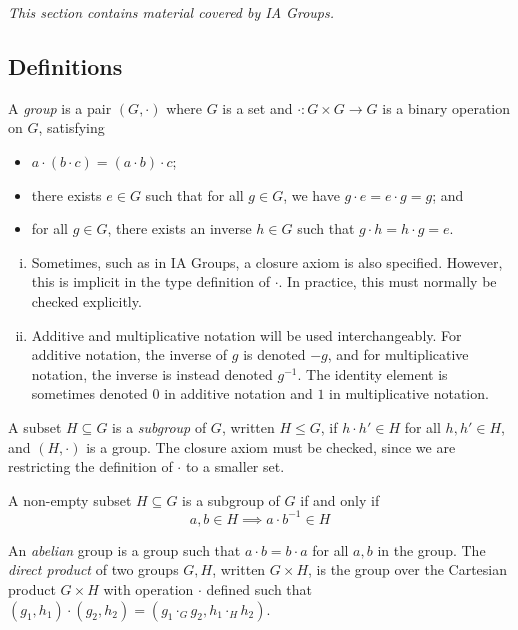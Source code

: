 \textit{This section contains material covered by IA Groups.}

\subsection{Definitions}
A \textit{group} is a pair \( (G, \cdot) \) where \( G \) is a set and \( \cdot \colon G \times G \to G \) is a binary operation on \( G \), satisfying
\begin{itemize}
	\item \( a \cdot (b \cdot c) = (a \cdot b) \cdot c \);
	\item there exists \( e \in G \) such that for all \( g \in G \), we have \( g \cdot e = e \cdot g = g \); and
	\item for all \( g \in G \), there exists an inverse \( h \in G \) such that \( g \cdot h = h \cdot g = e \).
\end{itemize}
\begin{remark}
	\begin{enumerate}[(i)]
		\item Sometimes, such as in IA Groups, a closure axiom is also specified.
			However, this is implicit in the type definition of \( \cdot \).
			In practice, this must normally be checked explicitly.
		\item Additive and multiplicative notation will be used interchangeably.
			For additive notation, the inverse of \( g \) is denoted \( -g \), and for multiplicative notation, the inverse is instead denoted \( g^{-1} \).
			The identity element is sometimes denoted \( 0 \) in additive notation and \( 1 \) in multiplicative notation.
	\end{enumerate}
\end{remark}
A subset \( H \subseteq G \) is a \textit{subgroup} of \( G \), written \( H \leq G \), if \( h \cdot h' \in H \) for all \( h, h' \in H \), and \( (H, \cdot) \) is a group.
The closure axiom must be checked, since we are restricting the definition of \( \cdot \) to a smaller set.
\begin{remark}
	A non-empty subset \( H \subseteq G \) is a subgroup of \( G \) if and only if
	\[ a, b \in H \implies a \cdot b^{-1} \in H \]
\end{remark}
An \textit{abelian} group is a group such that \( a \cdot b = b \cdot a \) for all \( a, b \) in the group.
The \textit{direct product} of two groups \( G, H \), written \( G \times H \), is the group over the Cartesian product \( G \times H \) with operation \( \cdot \) defined such that \( (g_1, h_1) \cdot (g_2, h_2) = (g_1 \cdot_G g_2, h_1 \cdot_H h_2) \).

